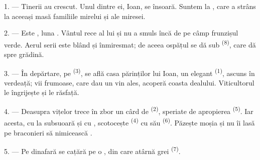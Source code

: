 %

\VUsaut{4.0mm}
\VUsaut{1.6mm}
\VUsaut{3.2mm}

\VUsaut{1.6mm}
\VUsaut{2.6mm}

\VUsaut{3.0mm}

1. --- Tinerii au crescut. Unul dintre ei, Ioan, se însoară. Suntem la
, care a strâns la aceeași masă familiile mirelui și ale
miresei.

2. --- Este , luna . Vântul rece al lui
 și  nu a smuls încă de pe câmp frunzișul
verde. Aerul serii este blând și înmiresmat; de aceea ospățul se dă sub
 \textsuperscript{(8)}, care dă spre grădină.

3. --- În depărtare, pe  \textsuperscript{(3)}, se află casa
părinților lui Ioan, un  elegant \textsuperscript{(1)}, ascuns în
verdeață; vii frumoase, care dau un vin ales, acoperă coasta dealului. Viticultorul
le îngrijește și le răsfață.

4. --- Deasupra vițelor trece în zbor un cârd de 
\textsuperscript{(2)}, speriate de apropierea 
\textsuperscript{(5)}. Iar acesta, cu  la subsuoară și cu
, scotocește  \textsuperscript{(4)} cu
 său \textsuperscript{(6)}. Păzește moșia și nu îi lasă pe
braconieri să nimicească .

5. --- Pe dinafară se cațără pe  o , din
care atârnă  grei \textsuperscript{(7)}.

